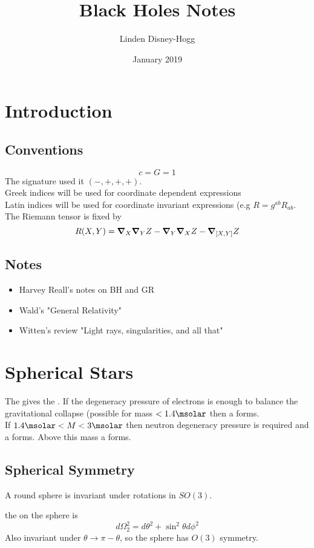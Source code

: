 \documentclass{article}
\title{Black Holes Notes}
\author{Linden Disney-Hogg}
\date{January 2019}
\begin{document}
\maketitle
\tableofcontents

\section{Introduction}
\subsection{Conventions}
\[
c = G = 1
\]
The signature used it $(-,+,+,+)$. \\
Greek indices will be used for coordinate dependent expressions \\
Latin indices will be used for coordinate invariant expressions (e.g $R=g^{ab}R_{ab}$.\\ 
The Riemann tensor is fixed by 
\[
R(X,Y) = \grad_X \grad_Y Z - \grad_Y \grad_X Z - \grad_{\comm[X]{Y}} Z
\]
\subsection{Notes}
\begin{itemize}
    \item Harvey Reall's notes on BH and GR 
    \item Wald's "General Relativity"
    \item Witten's review "Light rays, singularities, and all that"
\end{itemize}

\section{Spherical Stars}
The  gives the . If the degeneracy pressure of electrons is enough to balance the gravitational collapse (possible for mass  $<1.4 \msolar$ then a  forms.\\
If $1.4 \msolar < M < 3 \msolar$ then neutron degeneracy pressure is required and a  forms. Above this mass a  forms. 

\subsection{Spherical Symmetry}
A round sphere is invariant under rotations in $SO(3)$. 

\begin{definition}
the  on the sphere is 
\[
d\Omega_2^2 = d\theta^2 + \sin^2\theta d\phi^2
\]
Also invariant under $\theta \to \pi-\theta$, so the sphere has $O(3)$ symmetry. 
\end{definition}
\end{document}
